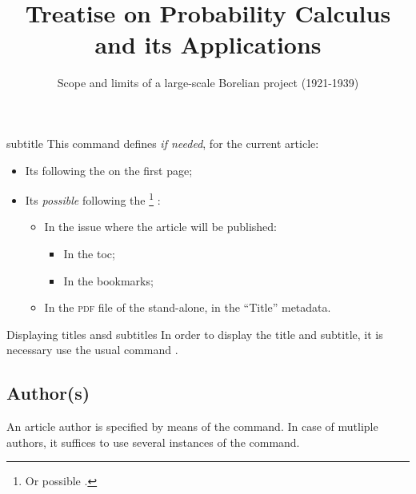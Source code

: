 \documentclass[english,nolocaltoc]{nwejmart}
\newtheorem[style=definition]{fact}
\newtheorem[title=experience]{experience}
\newtheorem[title-plural=rings]{ring}
\newtheorem[title=ideal,title-plural=ideals]{ideal}
\begin{document}
\begin{docCommand}{subtitle}{}
  This command defines \emph{if needed}, for the current article:
  \begin{itemize}
  \item Its  following the  on the first page;
  \item Its \emph{possible}  following the
    \footnote{Or possible .} :
    \begin{itemize}
    \item In the issue where the article will be published:
      \begin{itemize}
      \item In the \gls{toc};
      \item In the bookmarks;
      \end{itemize}
    \item In the \textsc{pdf} file of the stand-alone, in the \enquote{Title} metadata.
    \end{itemize}
  \end{itemize}
\end{docCommand}

\begin{bodycode}[listing options={deletekeywords={[2]title}}]
\title[Treatise on Probability Calculus]{Treatise on Probability Calculus and its Applications}
\subtitle[Scope and limits of a Borelian project]{Scope and limits of a large-scale Borelian project (1921-1939)}
\end{bodycode}

\begin{dbremark}{Displaying titles ansd subtitles}{}
  In order to display the title and subtitle, it is necessary use the usual command .
\end{dbremark}

\subsection{Author(s)}
\label{sec-authors}

An article author is specified by means of the  command. In case of mutliple authors, it suffices to use several instances of the command.
\end{document}
